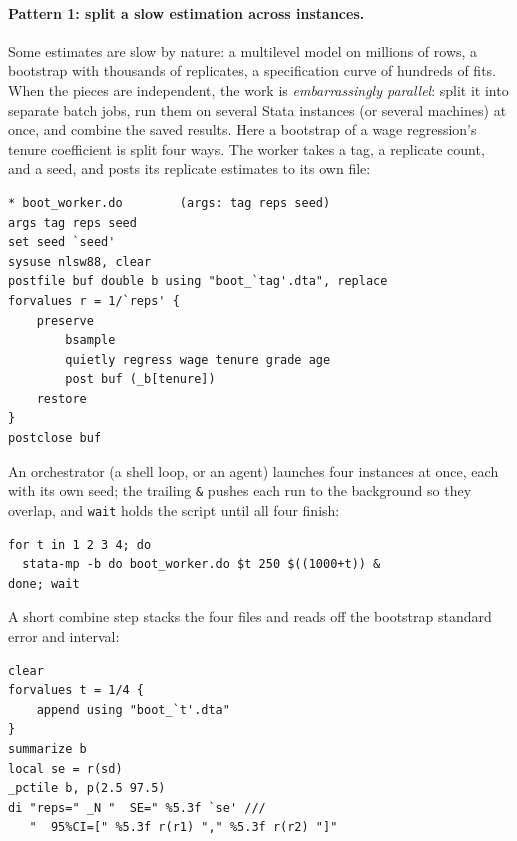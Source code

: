\documentclass[
    a4paper,
    fontsize=10pt,
    twoside=true,
    numbers=noenddot,
]{kaobook}
\begin{document}
\paragraph{Pattern 1: split a slow estimation across instances.} Some estimates are slow by nature: a multilevel model on millions of rows, a bootstrap with thousands of replicates, a specification curve of hundreds of fits. When the pieces are independent, the work is \emph{embarrassingly parallel}: split it into separate batch jobs, run them on several Stata instances (or several machines) at once, and combine the saved results. Here a bootstrap of a wage regression's tenure coefficient is split four ways. The worker takes a tag, a replicate count, and a seed, and posts its replicate estimates to its own file:
\par
{\footnotesize
\begin{verbatim}
* boot_worker.do        (args: tag reps seed)
args tag reps seed
set seed `seed'
sysuse nlsw88, clear
postfile buf double b using "boot_`tag'.dta", replace
forvalues r = 1/`reps' {
    preserve
        bsample
        quietly regress wage tenure grade age
        post buf (_b[tenure])
    restore
}
postclose buf
\end{verbatim}
}
An orchestrator (a shell loop, or an agent) launches four instances at once, each with its own seed; the trailing \texttt{\&} pushes each run to the background so they overlap, and \texttt{wait} holds the script until all four finish:
\par
{\footnotesize
\begin{verbatim}
for t in 1 2 3 4; do
  stata-mp -b do boot_worker.do $t 250 $((1000+t)) &
done; wait
\end{verbatim}
}
A short combine step stacks the four files and reads off the bootstrap standard error and interval:
\par
{\footnotesize
\begin{verbatim}
clear
forvalues t = 1/4 {
    append using "boot_`t'.dta"
}
summarize b
local se = r(sd)
_pctile b, p(2.5 97.5)
di "reps=" _N "  SE=" %5.3f `se' ///
   "  95%CI=[" %5.3f r(r1) "," %5.3f r(r2) "]"
\end{verbatim}
}
\end{document}

